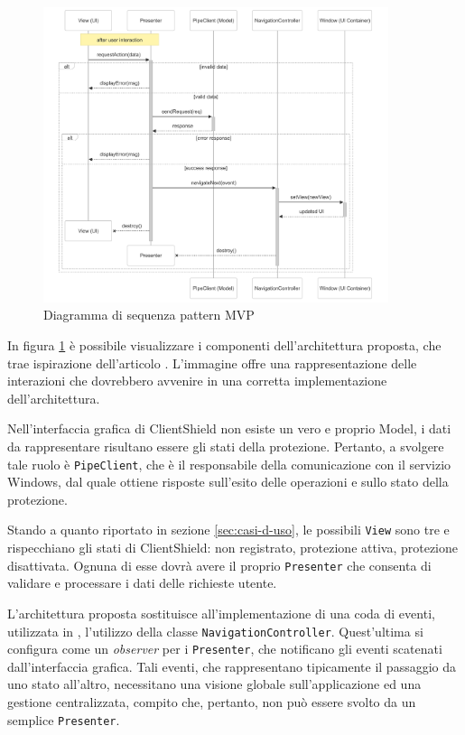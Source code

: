 \documentclass[12pt,a4paper,openright,twoside]{book}
\newcommand{\class}[1]{\texttt{#1}}
\begin{document}
\begin{figure}[H]
	\centering
	\includegraphics[width=0.9\textwidth]{figures/mvp-diagramma-sequenza.png}
	\caption{Diagramma di sequenza pattern MVP}
	\label{fig:mvp-diagramma-sequenza}
\end{figure}
In figura \ref{fig:mvp-diagramma-sequenza} è possibile visualizzare i componenti dell'architettura proposta, che trae ispirazione dell'articolo \cite{Ramsdale2010}.
L'immagine offre una rappresentazione delle interazioni che dovrebbero avvenire in una corretta implementazione dell'architettura.

Nell'interfaccia grafica di ClientShield non esiste un vero e proprio Model, i dati da rappresentare risultano essere gli stati della protezione.
Pertanto, a svolgere tale ruolo è \class{PipeClient}, che è il responsabile della comunicazione con il servizio Windows, dal quale ottiene risposte sull'esito delle operazioni e sullo stato della protezione.

Stando a quanto riportato in sezione \ref{sec:casi-d-uso}, le possibili \class{View} sono tre e rispecchiano gli stati di ClientShield: non registrato, protezione attiva, protezione disattivata.
Ognuna di esse dovrà avere il proprio \class{Presenter} che consenta di validare e processare i dati delle richieste utente.

L'architettura proposta sostituisce all'implementazione di una coda di eventi, utilizzata in \cite{Ramsdale2010}, l'utilizzo della classe \class{NavigationController}.
Quest'ultima si configura come un \textit{observer} per i \class{Presenter}, che notificano gli eventi scatenati dall'interfaccia grafica.
Tali eventi, che rappresentano tipicamente il passaggio da uno stato all'altro,  necessitano una visione globale sull'applicazione ed una gestione centralizzata, compito che, pertanto, non può essere svolto da un semplice \class{Presenter}.
\end{document}
